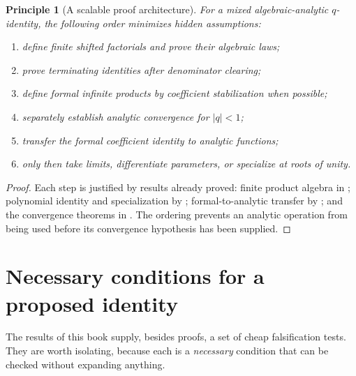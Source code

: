 \documentclass[11pt,oneside,openany]{book}
\newtheorem{principle}[principle]{Principle}
\theoremstyle{definition}
\theoremstyle{remark}
\newcommand{\abs}[1]{\lvert #1\rvert}
\begin{document}
\begin{principle}[A scalable proof architecture]\label{prin:proof-architecture}
For a mixed algebraic-analytic $q$-identity, the following order minimizes hidden assumptions:
\begin{enumerate}
\item define finite shifted factorials and prove their algebraic laws;
\item prove terminating identities after denominator clearing;
\item define formal infinite products by coefficient stabilization when possible;
\item separately establish analytic convergence for $\abs q<1$;
\item transfer the formal coefficient identity to analytic functions;
\item only then take limits, differentiate parameters, or specialize at roots of unity.
\end{enumerate}
\end{principle}

\begin{proof}
Each step is justified by results already proved: finite product algebra in ; polynomial identity and specialization by ; formal-to-analytic transfer by ; and the convergence theorems in .  The ordering prevents an analytic operation from being used before its convergence hypothesis has been supplied.
\end{proof}

\section{Necessary conditions for a proposed identity}

The results of this book supply, besides proofs, a set of cheap falsification
tests.  They are worth isolating, because each is a \emph{necessary}
condition that can be checked without expanding anything.
\end{document}
